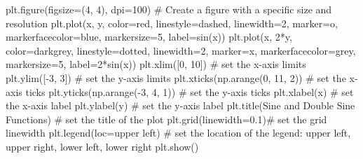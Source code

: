 \documentclass[
  letterpaper,
  DIV=11,
  numbers=noendperiod]{scrreprt}
\newenvironment{Shaded}{\begin{snugshade}}{\end{snugshade}}
\newcommand{\CommentTok}[1]{\textcolor[rgb]{0.37,0.37,0.37}{#1}}
\newcommand{\DecValTok}[1]{\textcolor[rgb]{0.68,0.00,0.00}{#1}}
\newcommand{\FloatTok}[1]{\textcolor[rgb]{0.68,0.00,0.00}{#1}}
\newcommand{\NormalTok}[1]{\textcolor[rgb]{0.00,0.23,0.31}{#1}}
\newcommand{\OperatorTok}[1]{\textcolor[rgb]{0.37,0.37,0.37}{#1}}
\newcommand{\StringTok}[1]{\textcolor[rgb]{0.13,0.47,0.30}{#1}}
\begin{document}
\begin{Shaded}
\begin{Highlighting}[]
\NormalTok{plt.figure(figsize}\OperatorTok{=}\NormalTok{(}\DecValTok{4}\NormalTok{, }\DecValTok{4}\NormalTok{), dpi}\OperatorTok{=}\DecValTok{100}\NormalTok{)}
\CommentTok{\# Create a figure with a specific size and resolution}
\NormalTok{plt.plot(x, y, color}\OperatorTok{=}\StringTok{\textquotesingle{}red\textquotesingle{}}\NormalTok{, linestyle}\OperatorTok{=}\StringTok{\textquotesingle{}dashed\textquotesingle{}}\NormalTok{, linewidth}\OperatorTok{=}\DecValTok{2}\NormalTok{, marker}\OperatorTok{=}\StringTok{\textquotesingle{}o\textquotesingle{}}\NormalTok{, }
\NormalTok{            markerfacecolor}\OperatorTok{=}\StringTok{\textquotesingle{}blue\textquotesingle{}}\NormalTok{, markersize}\OperatorTok{=}\DecValTok{5}\NormalTok{,}
\NormalTok{            label}\OperatorTok{=}\StringTok{\textquotesingle{}sin(x)\textquotesingle{}}\NormalTok{)}
\NormalTok{plt.plot(x, }\DecValTok{2}\OperatorTok{*}\NormalTok{y, color}\OperatorTok{=}\StringTok{\textquotesingle{}darkgrey\textquotesingle{}}\NormalTok{, linestyle}\OperatorTok{=}\StringTok{\textquotesingle{}dotted\textquotesingle{}}\NormalTok{, linewidth}\OperatorTok{=}\DecValTok{2}\NormalTok{, marker}\OperatorTok{=}\StringTok{\textquotesingle{}x\textquotesingle{}}\NormalTok{,}
\NormalTok{            markerfacecolor}\OperatorTok{=}\StringTok{\textquotesingle{}grey\textquotesingle{}}\NormalTok{, markersize}\OperatorTok{=}\DecValTok{5}\NormalTok{,}
\NormalTok{            label}\OperatorTok{=}\StringTok{\textquotesingle{}2*sin(x)\textquotesingle{}}\NormalTok{)}
\NormalTok{plt.xlim([}\DecValTok{0}\NormalTok{, }\DecValTok{10}\NormalTok{]) }\CommentTok{\# set the x{-}axis limits}
\NormalTok{plt.ylim([}\OperatorTok{{-}}\DecValTok{3}\NormalTok{, }\DecValTok{3}\NormalTok{]) }\CommentTok{\# set the y{-}axis limits}
\NormalTok{plt.xticks(np.arange(}\DecValTok{0}\NormalTok{, }\DecValTok{11}\NormalTok{, }\DecValTok{2}\NormalTok{)) }\CommentTok{\# set the x{-}axis ticks}
\NormalTok{plt.yticks(np.arange(}\OperatorTok{{-}}\DecValTok{3}\NormalTok{, }\DecValTok{4}\NormalTok{, }\DecValTok{1}\NormalTok{)) }\CommentTok{\# set the y{-}axis ticks}
\NormalTok{plt.xlabel(}\StringTok{\textquotesingle{}x\textquotesingle{}}\NormalTok{) }\CommentTok{\# set the x{-}axis label}
\NormalTok{plt.ylabel(}\StringTok{\textquotesingle{}y\textquotesingle{}}\NormalTok{) }\CommentTok{\# set the y{-}axis label}
\NormalTok{plt.title(}\StringTok{\textquotesingle{}Sine and Double Sine Functions\textquotesingle{}}\NormalTok{) }\CommentTok{\# set the title of the plot}
\NormalTok{plt.grid(linewidth}\OperatorTok{=}\FloatTok{0.1}\NormalTok{)}\CommentTok{\# set the grid linewidth}
\NormalTok{plt.legend(loc}\OperatorTok{=}\StringTok{\textquotesingle{}upper left\textquotesingle{}}\NormalTok{) }\CommentTok{\# set the location of the legend: upper left, upper right, lower left, lower right}
\NormalTok{plt.show()}
\end{Highlighting}
\end{Shaded}
\end{document}
